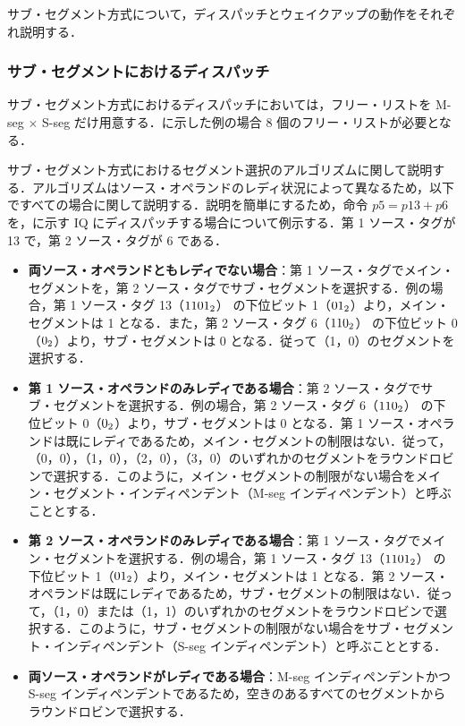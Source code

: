サブ・セグメント方式について，ディスパッチとウェイクアップの動作をそれぞれ説明する．

\subsubsection{サブ・セグメントにおけるディスパッチ}
サブ・セグメント方式におけるディスパッチにおいては，フリー・リストを M-seg $\times$ S-seg だけ用意する．に示した例の場合 8 個のフリー・リストが必要となる．

サブ・セグメント方式におけるセグメント選択のアルゴリズムに関して説明する．アルゴリズムはソース・オペランドのレディ状況によって異なるため，以下ですべての場合に関して説明する．説明を簡単にするため，命令 $p5 = p13 + p6$ を，に示す IQ にディスパッチする場合について例示する．第 1 ソース・タグが 13 で，第 2 ソース・タグが 6 である．
\begin{itemize}
  \item \textbf{両ソース・オペランドともレディでない場合}：第 1 ソース・タグでメイン・セグメントを，第 2 ソース・タグでサブ・セグメントを選択する．例の場合，第 1 ソース・タグ 13（${\rm 1101_2}$） の下位ビット 1（${\rm 01_2}$）より，メイン・セグメントは 1 となる．また，第 2 ソース・タグ 6（${\rm 110_2}$） の下位ビット 0（${\rm 0_2}$）より，サブ・セグメントは 0 となる．従って（1，0）のセグメントを選択する． 
  \item \textbf{第 1 ソース・オペランドのみレディである場合}：第 2 ソース・タグでサブ・セグメントを選択する．例の場合，第 2 ソース・タグ 6（${\rm 110_2}$） の下位ビット 0（${\rm 0_2}$）より，サブ・セグメントは 0 となる．第 1 ソース・オペランドは既にレディであるため，メイン・セグメントの制限はない．従って，（0，0），（1，0），（2，0），（3，0）のいずれかのセグメントをラウンドロビンで選択する．このように，メイン・セグメントの制限がない場合をメイン・セグメント・インディペンデント（M-seg インディペンデント）と呼ぶこととする．
  \item \textbf{第 2 ソース・オペランドのみレディである場合}：第 1 ソース・タグでメイン・セグメントを選択する．例の場合，第 1 ソース・タグ 13（${\rm 1101_2}$） の下位ビット 1（${\rm 01_2}$）より，メイン・セグメントは 1 となる．第 2 ソース・オペランドは既にレディであるため，サブ・セグメントの制限はない．従って，（1，0）または（1，1）のいずれかのセグメントをラウンドロビンで選択する．このように，サブ・セグメントの制限がない場合をサブ・セグメント・インディペンデント（S-seg インディペンデント）と呼ぶこととする．
  \item \textbf{両ソース・オペランドがレディである場合}：M-seg インディペンデントかつ S-seg インディペンデントであるため，空きのあるすべてのセグメントからラウンドロビンで選択する．
\end{itemize}

